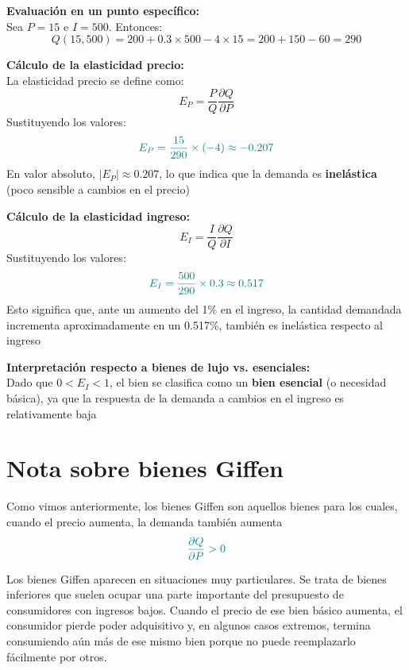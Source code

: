 \documentclass{article}
\begin{document}
\textbf{Evaluación en un punto específico:}\\
Sea \(P = 15\) e \(I = 500\). Entonces:
\[
Q(15, 500) = 200 + 0.3 \times 500 - 4 \times 15 = 200 + 150 - 60 = 290
\]

\textbf{Cálculo de la elasticidad precio:}\\
La elasticidad precio se define como:
\[
E_P = \frac{P}{Q}\frac{\partial Q}{\partial P}
\]
Sustituyendo los valores:
\[
\color{teal}
E_P = \frac{15}{290} \times (-4) \approx -0.207
\]
En valor absoluto, \(\left|E_P\right| \approx 0.207\), lo que indica que la demanda es \textbf{inelástica} (poco sensible a cambios en el precio)

\textbf{Cálculo de la elasticidad ingreso:}
\[
E_I = \frac{I}{Q}\frac{\partial Q}{\partial I}
\]
Sustituyendo los valores:
\[
\color{teal}
E_I = \frac{500}{290} \times 0.3 \approx 0.517
\]
Esto significa que, ante un aumento del 1\% en el ingreso, la cantidad demandada incrementa aproximadamente en un 0.517\%, también es inelástica respecto al ingreso

\textbf{Interpretación respecto a bienes de lujo vs. esenciales:}\\
Dado que \(0 < E_I < 1\), el bien se clasifica como un \textbf{\color{teal}bien esencial} (o necesidad básica), ya que la respuesta de la demanda a cambios en el ingreso es relativamente baja


\newpage

\section*{Nota sobre bienes Giffen}



Como vimos anteriormente, los bienes Giffen son aquellos bienes para los cuales, cuando el precio aumenta, la demanda también aumenta
\[
\color{teal}
\frac{\partial Q}{\partial P} > 0
\]

Los bienes Giffen aparecen en situaciones muy particulares. Se trata de bienes inferiores que suelen ocupar una parte importante del presupuesto de consumidores con ingresos bajos. Cuando el precio de ese bien básico aumenta, el consumidor pierde poder adquisitivo y, en algunos casos extremos, termina consumiendo aún más de ese mismo bien porque no puede reemplazarlo fácilmente por otros.
\end{document}
